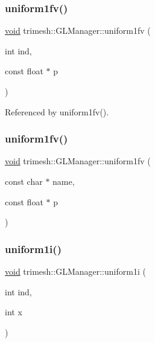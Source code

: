 \subsubsection{\texorpdfstring{uniform1fv()}{uniform1fv()}\hspace{0.1cm}{\footnotesize\ttfamily [1/2]}}
{\footnotesize\ttfamily \hyperlink{namespacetrimesh_a784ddfd979e1c579bda795a8edfc3f43}{void} trimesh\+::\+G\+L\+Manager\+::uniform1fv (\begin{DoxyParamCaption}\item[{int}]{ind,  }\item[{const float $\ast$}]{p }\end{DoxyParamCaption})\hspace{0.3cm}{\ttfamily [inline]}}



Referenced by uniform1fv().

\mbox{\label{classtrimesh_1_1GLManager_afd33772a444a7c38a8b118bc67a8e8df}} 
\subsubsection{\texorpdfstring{uniform1fv()}{uniform1fv()}\hspace{0.1cm}{\footnotesize\ttfamily [2/2]}}
{\footnotesize\ttfamily \hyperlink{namespacetrimesh_a784ddfd979e1c579bda795a8edfc3f43}{void} trimesh\+::\+G\+L\+Manager\+::uniform1fv (\begin{DoxyParamCaption}\item[{const char $\ast$}]{name,  }\item[{const float $\ast$}]{p }\end{DoxyParamCaption})\hspace{0.3cm}{\ttfamily [inline]}}

\mbox{\label{classtrimesh_1_1GLManager_a549dd90ffc5b778adbfd511b2d89b6db}} 
\subsubsection{\texorpdfstring{uniform1i()}{uniform1i()}\hspace{0.1cm}{\footnotesize\ttfamily [1/2]}}
{\footnotesize\ttfamily \hyperlink{namespacetrimesh_a784ddfd979e1c579bda795a8edfc3f43}{void} trimesh\+::\+G\+L\+Manager\+::uniform1i (\begin{DoxyParamCaption}\item[{int}]{ind,  }\item[{int}]{x }\end{DoxyParamCaption})}



